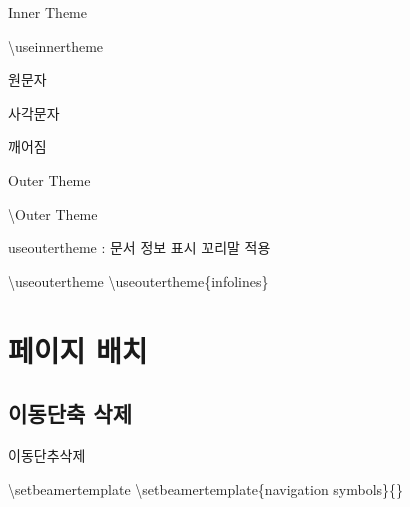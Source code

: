 \documentclass[10pt,blue,xcolor=pdftex,dvipsnames,table,handout]{beamer}
\begin{document}
		\begin{frame}[t,shrink=10]{Inner Theme}

			\begin{block} {\textbackslash useinnertheme}
			\begin{description}[12345678901234]
			\item [default]
			\item [circles]	 원문자			
			\item [rectangles]	 사각문자			
			\item [rounded]	 깨어짐
			\item [inmargin]		
			\end{description}
			\end{block}
		\end{frame}


		\begin{frame}[t]{Outer Theme}

			\begin{block} {\textbackslash Outer Theme}
			\end{block}
		\end{frame}



		\begin{frame}{useoutertheme : 문서 정보 표시 꼬리말 적용}

			\begin{block} {\textbackslash useoutertheme}
			\textbackslash useoutertheme\{infolines\}
			\end{block}
		\end{frame}



		\section{페이지 배치}

		\subsection{이동단축 삭제}
		\begin{frame}{이동단추삭제}

			\begin{block} {\textbackslash setbeamertemplate}
			\textbackslash setbeamertemplate\{navigation symbols\}\{\}
			\end{block}
		\end{frame}
\end{document}
